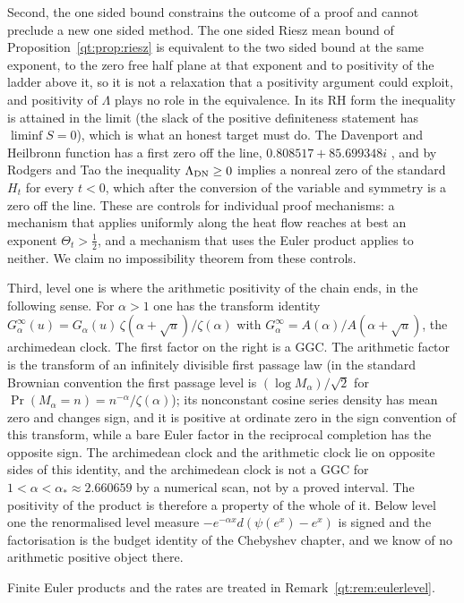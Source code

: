 Second, the one sided bound constrains the outcome of a proof and cannot preclude a new one sided method. The one sided Riesz mean bound of Proposition~\ref{qt:prop:riesz} is equivalent to the two sided bound at the same exponent, to the zero free half plane at that exponent and to positivity of the ladder above it, so it is not a relaxation that a positivity argument could exploit, and positivity of $\Lambda$ plays no role in the equivalence. In its RH form the inequality is attained in the limit (the slack of the positive definiteness statement has $\liminf S=0$), which is what an honest target must do. The Davenport and Heilbronn function has a first zero off the line, $0.808517+85.699348i$ \cite{Spira94}, and by Rodgers and Tao \cite{RodgersTao} the inequality $\Lambda_{\rm DN}\ge0$ implies a nonreal zero of the standard $H_t$ for every $t<0$, which after the conversion of the variable and symmetry is a zero off the line. These are controls for individual proof mechanisms: a mechanism that applies uniformly along the heat flow reaches at best an exponent $\Theta_t>\frac12$, and a mechanism that uses the Euler product applies to neither. We claim no impossibility theorem from these controls.

Third, level one is where the arithmetic positivity of the chain ends, in the following sense. For $\alpha>1$ one has the transform identity $G^\infty_\alpha(u)=G_\alpha(u)\,\zeta(\alpha+\sqrt u)/\zeta(\alpha)$ with $G^\infty_\alpha=A(\alpha)/A(\alpha+\sqrt u)$, the archimedean clock. The first factor on the right is a GGC. The arithmetic factor is the transform of an infinitely divisible first passage law (in the standard Brownian convention the first passage level is $(\log M_\alpha)/\sqrt2$ for $\Pr(M_\alpha=n)=n^{-\alpha}/\zeta(\alpha)$); its nonconstant cosine series density has mean zero and changes sign, and it is positive at ordinate zero in the sign convention of this transform, while a bare Euler factor in the reciprocal completion has the opposite sign. The archimedean clock and the arithmetic clock lie on opposite sides of this identity, and the archimedean clock is not a GGC for $1<\alpha<\alpha_*\approx2.660659$ by a numerical scan, not by a proved interval. The positivity of the product is therefore a property of the whole of it. Below level one the renormalised level measure $-e^{-\alpha x}d(\psi(e^x)-e^x)$ is signed and the factorisation is the budget identity of the Chebyshev chapter, and we know of no arithmetic positive object there.

Finite Euler products and the rates are treated in Remark~\ref{qt:rem:eulerlevel}.

